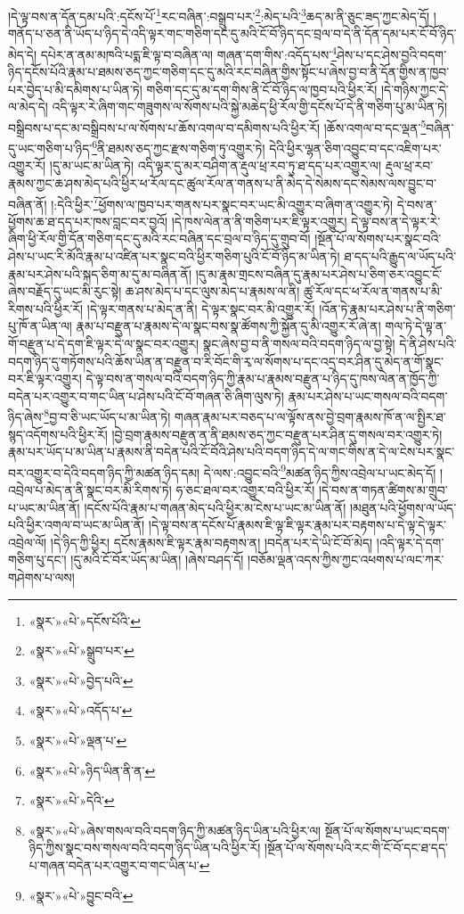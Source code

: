།དེ་ལྟ་བས་ན་དོན་དམ་པའི་:དངོས་པོ་\footnote{«སྣར་»«པེ་»དངོས་པོའི་}རང་བཞིན་:བསྒྲུབ་པར་\footnote{«སྣར་»«པེ་»སྒྲུབ་པར་}:མེད་པའི་\footnote{«སྣར་»«པེ་»བྱེད་པའི་}ཆད་མ་ནི་ཅུང་ཟད་ཀྱང་མེད་དོ། །
གནོད་པ་ཅན་ནི་ཡོད་པ་ཉིད་དེ་འདི་ལྟར་གང་གཅིག་དང་དུ་མའི་ངོ་བོ་ཉིད་དང་བྲལ་བ་དེ་ནི་དོན་དམ་པར་ངོ་བོ་ཉིད་མེད་དེ། དཔེར་ན་ནམ་མཁའི་པདྨ་ཇི་ལྟ་བ་བཞིན་ལ། གཞན་དག་གིས་:འདོད་པས་\footnote{«སྣར་»«པེ་»འདོད་པ་}ཤེས་པ་དང་ཤེས་བྱའི་བདག་ཉིད་དངོས་པོའི་རྣམ་པ་ཐམས་ཅད་ཀྱང་གཅིག་དང་དུ་མའི་རང་བཞིན་གྱིས་སྟོང་པ་ཞེས་བྱ་བ་ནི་དོན་གྱིས་ན་ཁྱབ་པར་བྱེད་པ་མི་དམིགས་པ་ཡིན་ཏེ། གཅིག་དང་དུ་མ་དག་གིས་ནི་ངོ་བོ་ཉིད་ལ་ཁྱབ་པའི་ཕྱིར་རོ། །དེ་གཉིས་ཀྱང་དེ་ལ་མེད་དེ། འདི་ལྟར་རེ་ཞིག་གང་གཟུགས་ལ་སོགས་པའི་སྐྱེ་མཆེད་ཕྱི་རོལ་གྱི་དངོས་པོ་དེ་ནི་གཅིག་པུ་མ་ཡིན་ཏེ། བསྒྲིབས་པ་དང་མ་བསྒྲིབས་པ་ལ་སོགས་པ་ཆོས་འགལ་བ་དམིགས་པའི་ཕྱིར་རོ། །ཆོས་འགལ་བ་དང་ལྡན་\footnote{«སྣར་»«པེ་»ལྡན་པ་}བཞིན་དུ་ཡང་གཅིག་པ་ཉིད་\footnote{«སྣར་»«པེ་»ཉིད་ཡིན་ནི་ན་}ནི་ཐམས་ཅད་ཀྱང་རྫས་གཅིག་ཏུ་འགྱུར་ཏེ། དེའི་ཕྱིར་ལྷན་ཅིག་འབྱུང་བ་དང་འཇིག་པར་འགྱུར་རོ། །དུ་མ་ཡང་མ་ཡིན་ཏེ། འདི་ལྟར་དུ་མར་བཤིག་ན་རྡུལ་ཕྲ་རབ་ཏུ་ཐ་དད་པར་འགྱུར་ལ། རྡུལ་ཕྲ་རབ་རྣམས་ཀྱང་ཆ་ཤས་མེད་པའི་ཕྱིར་ཕ་རོལ་དང་ཚུལ་རོལ་ན་གནས་པ་ནི་མེད་དེ་སེམས་དང་སེམས་ལས་བྱུང་བ་བཞིན་ནོ། །:དེའི་ཕྱིར་\footnote{«སྣར་»«པེ་»དེའི་}ཕྱོགས་ལ་ཁྱབ་པར་གནས་པར་སྣང་བར་ཡང་མི་འགྱུར་བ་ཞིག་ན་འགྱུར་ཏེ། དེ་བས་ན་ཕྱོགས་ཆ་ཐ་དད་པར་ཁས་བླང་བར་བྱའོ། །དེ་ཁས་ལེན་ན་ནི་གཅིག་པར་ཇི་ལྟར་འགྱུར། དེ་ལྟ་བས་ན་དེ་ལྟར་རེ་ཞིག་ཕྱི་རོལ་གྱི་དོན་གཅིག་དང་དུ་མའི་རང་བཞིན་དང་བྲལ་བ་ཉིད་དུ་གྲུབ་བོ། །སྔོན་པོ་ལ་སོགས་པར་སྣང་བའི་ཤེས་པ་ཡང་རི་མོའི་རྣམ་པ་འཛིན་པར་སྣང་བའི་ཕྱིར་གཅིག་པུའི་ངོ་བོ་ཉིད་མ་ཡིན་ཏེ། ཐ་དད་པའི་རྒྱུད་ལ་ཡོད་པའི་རྣམ་པར་ཤེས་པའི་སྐད་ཅིག་མ་དུ་མ་བཞིན་ནོ། །དུ་མ་རྣམ་གྲངས་བཞིན་དུ་རྣམ་པར་ཤེས་པ་ཅིག་ཅར་འབྱུང་ངོ་ཞེས་བརྗོད་དུ་ཡང་མི་རུང་སྟེ། ཆ་ཤས་མེད་པ་དང་ལུས་མེད་པ་རྣམས་ལ་ནི། ཚུ་རོལ་དང་ཕ་རོལ་ན་གནས་པ་མི་རིགས་པའི་ཕྱིར་རོ། །དེ་ལྟར་གནས་པ་མེད་ན་ནི། དེ་ལྟར་སྣང་བར་མི་འགྱུར་རོ། །འོན་ཏེ་རྣམ་པར་ཤེས་པ་ནི་གཅིག་པུ་ཁོ་ན་ཡིན་ལ། རྣམ་པ་བརྫུན་པ་རྣམས་དེ་ལ་སྣང་བས་སྣ་ཚོགས་ཀྱི་སྐྱོན་དུ་མི་འགྱུར་རོ་ཞེ་ན། གལ་ཏེ་དེ་ལྟ་ན་གོ་བརྫུན་པ་དེ་དག་ཇི་ལྟར་དེ་ལ་སྣང་བར་འགྱུར། སྣང་ཞེས་བྱ་བ་ནི་གསལ་བའི་བདག་ཉིད་ལ་བྱ་སྟེ། དེ་ནི་ཤེས་པའི་བདག་ཉིད་དུ་གཏོགས་པའི་ཆོས་ཡིན་ན་བརྫུན་བ་རི་བོང་གི་རྭ་ལ་སོགས་པ་དང་འདྲ་བར་ཤིན་དུ་མེད་ན་གོ་སྣང་བར་ཇི་ལྟར་འགྱུར། དེ་ལྟ་བས་ན་གསལ་བའི་བདག་ཉིད་ཀྱི་རྣམ་པ་རྣམས་བརྫུན་པ་ཉིད་དུ་ཁས་ལེན་ན་ཁྱོད་ཀྱི་བདེན་པར་འགྱུར་བ་གང་ཡིན་པ་ཤེས་པའི་ངོ་བོ་གཞན་ཅི་ཞིག་ལུས་ཏེ། རྣམ་པར་ཤེས་པ་ཡང་གསལ་བའི་བདག་ཉིད་ཞེས་\footnote{«སྣར་»«པེ་»ཞེས་གསལ་བའི་བདག་ཉིད་ཀྱི་མཚན་ཉིད་ཡིན་པའི་ཕྱིར་ལ། སྔོན་པོ་ལ་སོགས་པ་ཡང་བདག་ཉིད་ཀྱིས་སྣང་བས་གསལ་བའི་བདག་ཉིད་ཡིན་པའི་ཕྱིར་རོ། །སྔོན་པོ་ལ་སོགས་པའི་རང་གི་ངོ་བོ་དང་ཐ་དད་པ་གཞན་བདེན་པར་འགྱུར་བ་གང་ཡིན་པ་}བྱ་བ་ཅི་ཡང་ཡོད་པ་མ་ཡིན་ཏེ། གཞན་རྣམ་པར་བཅད་པ་ལ་ལྟོས་ནས་བྱེ་བྲག་རྣམས་ཁོ་ན་ལ་སྤྱིར་ཐ་སྙད་འདོགས་པའི་ཕྱིར་རོ། །བྱེ་བྲག་རྣམས་བརྫུན་ན་ནི་ཐམས་ཅད་ཀྱང་བརྫུན་པར་ཤིན་དུ་གསལ་བར་འགྱུར་ཏེ། རྣམ་པར་ཡོད་པ་མ་ཡིན་པ་རྣམས་ནི་བདེན་པའི་ངོ་བོའི་ཤེས་པའི་བདག་ཉིད་དེ་ལ་གང་གིས་ན་དེ་ལ་ངེས་པར་སྣང་བར་འགྱུར་བ་དེའི་བདག་ཉིད་ཀྱི་མཚན་ཉིད་དམ། དེ་ལས་:འབྱུང་བའི་\footnote{«སྣར་»«པེ་»བྱུང་བའི་}མཚན་ཉིད་ཀྱིས་འབྲེལ་པ་ཡང་མེད་དོ། །འབྲེལ་པ་མེད་ན་ནི་སྣང་བར་མི་རིགས་ཏེ། ཧ་ཅང་ཐལ་བར་འགྱུར་བའི་ཕྱིར་རོ། །དེ་བས་ན་གཏན་ཚིགས་མ་གྲུབ་པ་ཡང་མ་ཡིན་ནོ། །དངོས་པོའི་རྣམ་པ་གཞན་མེད་པའི་ཕྱིར་མ་ངེས་པ་ཡང་མ་ཡིན་ནོ། །མཐུན་པའི་ཕྱོགས་ལ་ཡོད་པའི་ཕྱིར་འགལ་བ་ཡང་མ་ཡིན་ནོ། །དེ་ལྟ་བས་ན་དངོས་པོ་རྣམས་ཇི་ལྟ་ཇི་ལྟར་རྣམ་པར་བརྟགས་པ་དེ་ལྟ་དེ་ལྟར་འབྲེལ་ལོ། །དེ་ཉིད་ཀྱི་ཕྱིར། དངོས་རྣམས་ཇི་ལྟར་རྣམ་བརྟགས་ན། །བདེན་པར་དེ་ཡི་ངོ་བོ་མེད། །འདི་ལྟར་དེ་དག་གཅིག་པུ་དང་། །དུ་མའི་ངོ་བོར་ཡོད་མ་ཡིན། །ཞེས་བཤད་དོ། །བཅོམ་ལྡན་འདས་ཀྱིས་ཀྱང་འཕགས་པ་ལང་ཀར་གཤེགས་པ་ལས། 